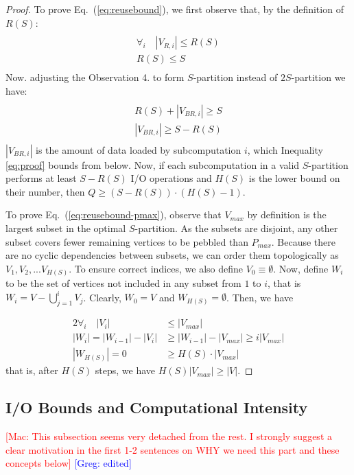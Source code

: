 \documentclass[sigplan,review,anonymous]{acmart}\settopmatter{printfolios=true,printccs=false,printacmref=false}
\newcommand\greg[1]{\textcolor{blue}{[Greg: #1]}}
\newcommand\mac[1]{\textcolor{red}{[Mac: #1]}}
\begin{document}
\begin{proof}
%
To prove Eq.~(\ref{eq:reusebound}), we first observe that, by the 
definition of 
$R(S)$:
\begin{multline}
\nonumber
\\
\forall_{i}\quad |V_{R,i}| \le R(S) \\
R(S) \le S \\
\end{multline}
Now. adjusting the Observation 4. to form $S$-partition instead of 
$2S$-partition we have:
\begin{multline}
\label{eq:proof}
\\
	R(S) + |V_{BR,i}| \ge S\\
	|V_{BR,i}| \ge S - R(S)\\
\end{multline}
$|V_{BR,i}|$ is the amount of data loaded by subcomputation $i$, which 
Inequality \ref{eq:proof} bounds from below. Now, if each subcomputation in a 
valid $S$-partition performs at least $S - R(S)$ I/O operations and $H(S)$ is 
the lower bound on their number, then $Q \ge (S - R(S)) \cdot (H(S) - 1)$.

To prove Eq.~(\ref{eq:reusebound-pmax}), observe that $V_{max}$ by definition
is the largest subset in the optimal $S$-partition. As the subsets are
disjoint, any other subset covers fewer remaining vertices to be pebbled than
$P_{max}$. Because there are no cyclic dependencies between subsets, we can
order them topologically as $V_1, V_2, ...V_{H(S)}$. To ensure correct indices,
we also define $V_0 \equiv \emptyset$. Now, define $W_i$ to be the set
of vertices not included in any subset from $1$ to $i$, that is $W_i = V -
\bigcup_{j=1}^{i} V_j$. Clearly, $W_0 = V$ and $W_{H(S)} = \emptyset$. Then, we
have

\begin{alignat}{2}
%
\nonumber
\forall_{i}\quad |V_i| & \le |V_{max}| \\
\nonumber
|W_i| = |W_{i-1}| - |V_i| & \ge |W_{i-1}| - |V_{max}| \ge i|V_{max}| \\
\nonumber
|W_{H(S)}| = 0 & \ge H(S) \cdot |V_{max}| 
%
\end{alignat}
%
that is, after $H(S)$ steps, we have $H(S) |V_{max}| \ge |V|$.
\end{proof}

\subsection{I/O Bounds and Computational Intensity}
\mac{This subsection seems very detached from the rest. I strongly suggest
a clear motivation in the first 1-2 sentences on WHY we need this part
and these concepts below} \greg{edited}
\end{document}
